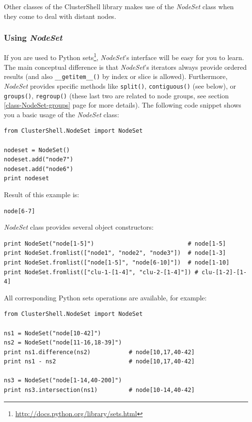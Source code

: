 \documentclass[english,a4paper]{csuserguide}
\newcommand{\NodeSet}{\textit{NodeSet}\xspace}
\begin{document}
Other classes of the ClusterShell library makes use of the \NodeSet class when they come to deal with distant nodes.

\subsubsection{Using \NodeSet}

If you are used to Python sets\footnote{\url{http://docs.python.org/library/sets.html}}, \NodeSet's interface will be easy for you to learn. The main conceptual difference is that \NodeSet's iterators always provide ordered results (and also  \lstinline+__getitem__()+ by index or slice is allowed). Furthermore, \NodeSet provides specific methods like  \lstinline+split()+,  \lstinline+contiguous()+ (see below), or  \lstinline+groups()+,  \lstinline+regroup()+ (these last two are related to node groups, see section  \ref{class-NodeSet-groups} page \pageref{class-NodeSet-groups} for more details). The following code snippet shows you a basic usage of the \NodeSet class:
\bigskip

\begin{lstlisting}[breaklines=true, breakatwhitespace=true]
from ClusterShell.NodeSet import NodeSet

nodeset = NodeSet()
nodeset.add("node7")
nodeset.add("node6")
print nodeset
\end{lstlisting}

Result of this example is:
\medskip
\begin{lstlisting}[breaklines=true, breakatwhitespace=true]
node[6-7]
\end{lstlisting}

\NodeSet class provides several object constructors:
\medskip
\begin{lstlisting}[breaklines=true, breakatwhitespace=true]
print NodeSet("node[1-5]")                           # node[1-5]
print NodeSet.fromlist(["node1", "node2", "node3"])  # node[1-3]
print NodeSet.fromlist(["node[1-5]", "node[6-10]"])  # node[1-10]
print NodeSet.fromlist(["clu-1-[1-4]", "clu-2-[1-4]"]) # clu-[1-2]-[1-4]
\end{lstlisting}

All corresponding Python sets operations are available, for example:
\medskip
\begin{lstlisting}[breaklines=true, breakatwhitespace=true]
from ClusterShell.NodeSet import NodeSet

ns1 = NodeSet("node[10-42]")
ns2 = NodeSet("node[11-16,18-39]")
print ns1.difference(ns2)           # node[10,17,40-42]
print ns1 - ns2                     # node[10,17,40-42]

ns3 = NodeSet("node[1-14,40-200]")
print ns3.intersection(ns1)         # node[10-14,40-42]
\end{lstlisting}
\end{document}
